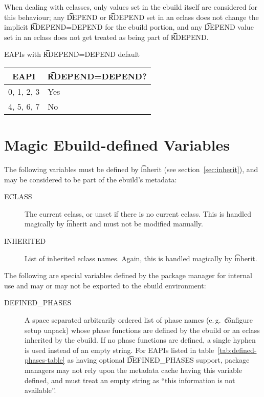 When dealing with eclasses, only values set in the ebuild itself are considered for this behaviour;
any \t{DEPEND} or \t{RDEPEND} set in an eclass does not change the implicit \t{RDEPEND=DEPEND} for
the ebuild portion, and any \t{DEPEND} value set in an eclass does not get treated as being part of
\t{RDEPEND}.

\begin{centertable}{EAPIs with \t{RDEPEND=DEPEND} default}
    \label{tab:rdepend-depend-table}
    \begin{tabular}{ll}
      \toprule
      \multicolumn{1}{c}{\textbf{EAPI}} &
      \multicolumn{1}{c}{\textbf{\t{RDEPEND=DEPEND}?}} \\
      \midrule
      0, 1, 2, 3        & Yes \\
      4, 5, 6, 7        & No  \\
      \bottomrule
    \end{tabular}
\end{centertable}

\section{Magic Ebuild-defined Variables}

The following variables must be defined by \t{inherit} (see section~\ref{sec:inherit}), and may be
considered to be part of the ebuild's metadata:

\begin{description}
\item[ECLASS] The current eclass, or unset if there is no current eclass. This is handled magically
    by \t{inherit} and must not be modified manually.
\item[INHERITED] List of inherited eclass names. Again, this is handled magically by \t{inherit}.
\end{description}


The following are special variables defined by the package manager for internal use and may or may
not be exported to the ebuild environment:

\begin{description}
\item[DEFINED_PHASES]  A space separated arbitrarily ordered list of
phase names (e.\,g.\ \t{configure setup unpack}) whose phase functions are defined by the ebuild or
an eclass inherited by the ebuild. If no phase functions are defined, a single hyphen is used
instead of an empty string. For EAPIs listed in table~\ref{tab:defined-phases-table} as having
optional \t{DEFINED_PHASES} support, package managers may not rely upon the metadata cache having
this variable defined, and must treat an empty string as ``this information is not available''.
\end{description}

